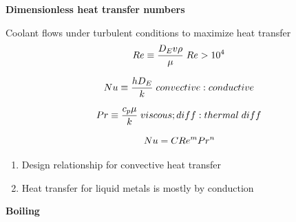 \documentclass[aspectratio=1610,pdftex,dvipsnames,compress,xcolor={dvipsnames}]{beamer}
\begin{document}
\begin{frame}[plain]{}
    \centering\LARGE\textbf{Dimensionless heat transfer numbers}
\end{frame}


\addtocounter{framenumber}{-1} 
\begin{frame}{Coolant flows under turbulent conditions to maximize heat transfer}
    \begin{equation}
        \LARGE
        Re \equiv \frac{D_E v \rho}{\mu} \; Re > 10^4
    \end{equation}

    \begin{equation}
        \LARGE
        Nu \equiv \frac{hD_E}{k} \; convective:conductive
    \end{equation}

    \begin{equation}
        \LARGE
        Pr \equiv \frac{c_p\mu}{k} \; viscous; diff:thermal\; diff
    \end{equation}

    \begin{equation}
        \LARGE
        Nu = CRe^mPr^n
    \end{equation}

    \vspace*{\fill}

    \begin{enumerate}[series=outerlist,topsep=0pt,itemsep=21pt,leftmargin=*,label=(\arabic*)]
        \item[]Design relationship for convective heat transfer
        \item[]Heat transfer for liquid metals is mostly by conduction
    \end{enumerate}
\end{frame}


\begin{frame}[plain]{}
    \centering\LARGE\textbf{Boiling}
\end{frame}
\end{document}
